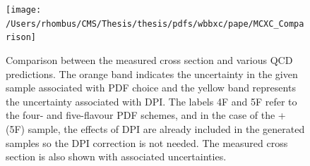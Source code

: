 \begin{figure}[htbp]
\caption[Cross section comparison for \wbb and generators]{
 Comparison between the measured \ppwbblnbb cross section and 
  various QCD predictions.
 The orange band indicates the uncertainty 
  in the given sample associated with PDF choice
  and the yellow band represents the uncertainty
  associated with DPI.
 The labels 4F and 5F refer to the four- and five-flavour
  PDF schemes, and 
  in the case of the \MADGRAPH + \textsc{} (5F) sample,
  the effects of DPI are already included in the generated
  samples so the DPI correction is not needed.
 The measured cross section is also shown with associated uncertainties.
 }
\center
\texttt{[image: /Users/rhombus/CMS/Thesis/thesis/pdfs/wbbxc/pape/MCXC\_Comparison]}
\label{fig:xc_comparison}
\end{figure}

